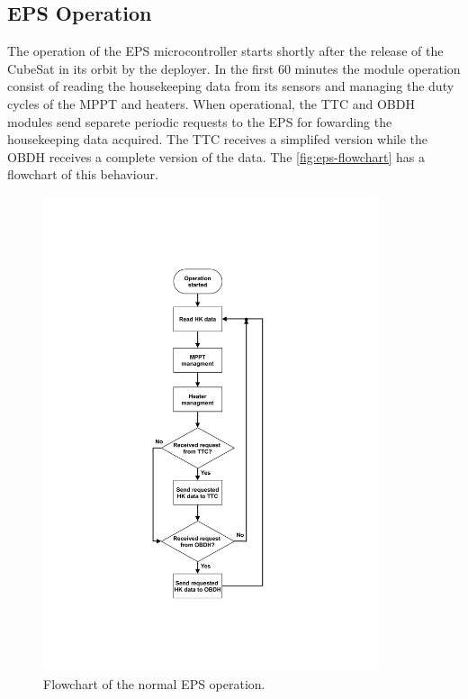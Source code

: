 \subsection{EPS Operation}

The operation of the EPS microcontroller starts shortly after the release of the CubeSat in its orbit by the deployer.
In the first 60 minutes the module operation consist of reading the housekeeping data from its sensors and managing the duty cycles of the MPPT and heaters.
When operational, the TTC and OBDH modules send separete periodic requests to the EPS for fowarding the housekeeping data acquired.
The TTC receives a simplifed version while the OBDH receives a complete version of the data.
The \autoref{fig:eps-flowchart} has a flowchart of this behaviour.

\begin{figure}[!ht]
    \begin{center}
        \includegraphics[width=0.88\textwidth]{figures/eps_flowchart.pdf}
        \caption{Flowchart of the normal EPS operation.}
        \label{fig:eps-flowchart}
    \end{center}
\end{figure}

